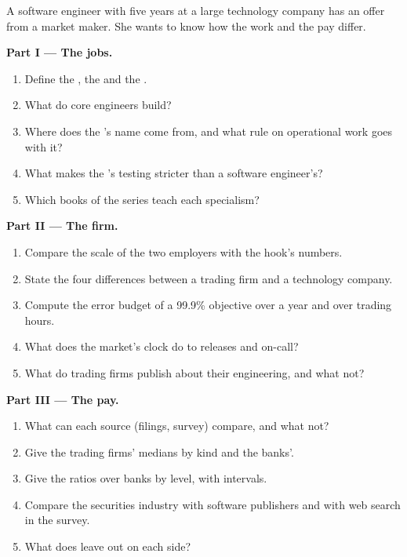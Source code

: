 \begin{problem}\label{pb:in:software-engineer:1}
A software engineer with five years at a large technology company has an offer from a market maker. She wants to know how
the work and the pay differ.

\medskip\noindent\textbf{Part I --- The jobs.}
\begin{enumerate}
\item Define the , the  and the .
\item What do core engineers build?
\item Where does the 's name come from, and what rule on operational work goes with it?
\item What makes the 's testing stricter than a software engineer's?
\item Which books of the series teach each specialism?
\end{enumerate}

\medskip\noindent\textbf{Part II --- The firm.}
\begin{enumerate}[resume]
\item Compare the scale of the two employers with the hook's numbers.
\item State the four differences between a trading firm and a technology company.
\item Compute the error budget of a 99.9\% objective over a year and over trading hours.
\item What does the market's clock do to releases and on-call?
\item What do trading firms publish about their engineering, and what not?
\end{enumerate}

\medskip\noindent\textbf{Part III --- The pay.}
\begin{enumerate}[resume]
\item What can each source (filings, survey) compare, and what not?
\item Give the trading firms' medians by kind and the banks'.
\item Give the ratios over banks by level, with intervals.
\item Compare the securities industry with software publishers and with web search in the survey.
\item What does  leave out on each side?
\end{enumerate}


\end{problem}
